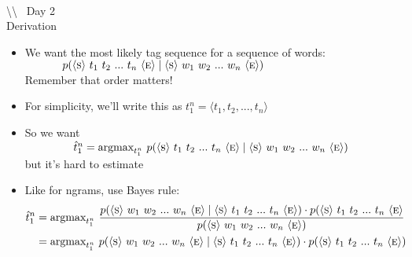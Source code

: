 \documentclass[11pt,letterpaper]{article}
\newcommand{\bs}{\textbackslash}
\newcommand{\ngramstart}{\ensuremath{\langle \textsc{s} \rangle}}
\newcommand{\ngramend}{\ensuremath{\langle \textsc{e} \rangle}}
\begin{document}
~\\ \bs\bs~ Day 2 \\

Derivation

\begin{itemize}
  \item We want the most likely tag sequence for a sequence of words: \vspace{2mm} \\
        $~~~~~~~~~~p(\ngramstart~t_1~t_2~...~t_n~\ngramend \mid \ngramstart~w_1~w_2~...~w_n~\ngramend)$
        \vspace{2mm} \\ Remember that order matters!
  \item For simplicity, we'll write this as $t_1^n = \langle t_1, t_2, ..., t_n \rangle$
  \item So we want  \vspace{2mm} \\
  $~~~~~~~~~~~~~\hat{t}_1^n = \text{argmax}_{t_1^n}~p(\ngramstart~t_1~t_2~...~t_n~\ngramend \mid \ngramstart~w_1~w_2~...~w_n~\ngramend)$ \vspace{2mm} \\ but it's hard to estimate
  \item Like for ngrams, use Bayes rule: 
  \begin{align*}
  \hat{t}_1^n 
  &= \text{argmax}_{t_1^n}~\frac{p(\ngramstart~w_1~w_2~...~w_n~\ngramend \mid \ngramstart~t_1~t_2~...~t_n~\ngramend) \cdot p(\ngramstart~t_1~t_2~...~t_n~\ngramend}{p(\ngramstart~w_1~w_2~...~w_n~\ngramend)} \\
  & = \text{argmax}_{t_1^n}~p(\ngramstart~w_1~w_2~...~w_n~\ngramend \mid \ngramstart~t_1~t_2~...~t_n~\ngramend) \cdot p(\ngramstart~t_1~t_2~...~t_n~\ngramend)
\end{align*}


\end{itemize}
\end{document}
